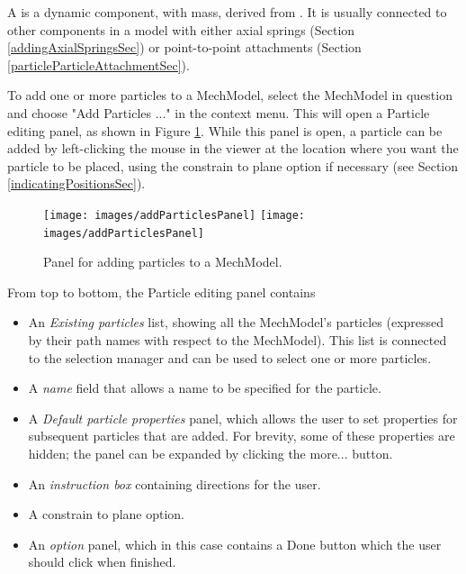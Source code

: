 \documentclass{article}
\begin{document}
A  is a dynamic component,
with mass, derived from . It is
usually connected to other components in a model with either axial
springs (Section \ref{addingAxialSpringsSec}) or point-to-point attachments
(Section \ref{particleParticleAttachmentSec}).

To add one or more particles to a MechModel, select the MechModel in
question and choose {\sf "Add Particles ..."} in the context menu. This
will open a Particle editing panel, as shown in
Figure \ref{addParticlesPanelFig}. While this panel is open, a particle can be
added by left-clicking the mouse in the viewer at the location where
you want the particle to be placed, using the {\sf constrain to plane} option if
necessary (see Section \ref{indicatingPositionsSec}).

\begin{figure}
\begin{center}
\iflatexml
\texttt{[image: images/addParticlesPanel]}
\else
\texttt{[image: images/addParticlesPanel]}
\fi
\end{center}
\caption{Panel for adding particles to a MechModel.}%
\label{addParticlesPanelFig}
\end{figure}

From top to bottom, the Particle editing panel contains

\begin{itemize}

\item An {\it Existing particles} list, showing all the MechModel's particles
(expressed by their path names with respect to the MechModel). This
list is connected to the selection manager and can be used to select
one or more particles.

\item A {\it name} field that allows a name to be specified for the particle.

\item A {\it Default particle properties} panel, which allows the user to set
properties for subsequent particles that are added. For brevity, some
of these properties are hidden; the panel can be expanded by clicking
the {\sf more...} button.

\item An {\it instruction box} containing directions for the user.

\item A {\sf constrain to plane} option.

\item An {\it option} panel, which in this case contains a {\sf Done} button which
the user should click when finished.

\end{itemize}
\end{document}
